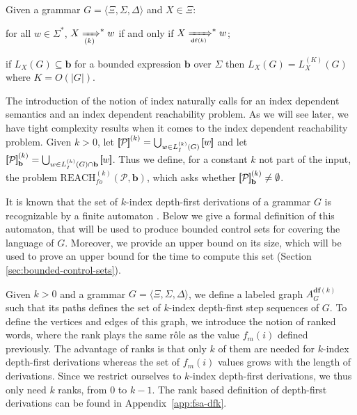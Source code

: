 \documentclass[final]{llncs}
\newcommand{\rbr}{{\bf ]\!\!]}}
\newcommand{\lbr}{{\bf [\!\![}}
\newcommand{\sem}[1]{\lbr #1 \rbr}
\def\tuple#1{{\langle #1 \rangle}}
\def\len#1{{\vert{#1}\vert}}
\def\prod{\Delta}
\def\pat{{\mathbf{b}}}
\def\df#1{\scriptscriptstyle\mathbf{df}(#1)}
\def\Vars{\ensuremath{\Xi}}
\def\foreach{\mathrm{REACH}_{\mathit{fo}}}
\begin{document}
\begin{theorem}\label{thm:luker}
Given a grammar \(G = \tuple{\Vars, \Sigma, \prod} \) and \(X\in\Vars\):
\begin{compactitem}
\item for all \(w\in\Sigma^*\),  \(X \xRightarrow[(k)]{}^* w \) if and only if
	\(X \xRightarrow[\df{k}]{}^* w\);
\item if \(L_X(G) \subseteq \pat\) for a bounded expression \(\pat\) over \(\Sigma\) then
	\(L_X(G) = L_X^{(K)}(G) \) where \(K = O(\len{G}) \).
\end{compactitem}
\end{theorem}

The introduction of the notion of index naturally calls for an index
dependent semantics and an index dependent reachability problem. As we
will see later, we have tight complexity results when it comes to the
index dependent reachability problem. Given \(k>0\),
let \(\sem{\mathcal{P}}^{(k)} = \bigcup_{w \in L_I^{(k)}(G)} \sem{w}\)
and let \(\sem{\mathcal{P}}^{(k)}_{\pat} = \bigcup_{w \in
L_I^{(k)}(G)\cap\pat} \sem{w}\). Thus we define, for a constant \(k\)
not part of the input, the
problem \(\foreach^{(k)}(\mathcal{P},\pat)\), which asks
whether \(\sem{\mathcal{P}}^{(k)}_\pat \neq \emptyset\).


It is known that the set of \(k\)-index depth-first derivations of a
grammar \(G\) is recognizable by a finite
automaton \cite[Lemma~5]{Luker80}. Below we give a formal definition of this
automaton, that will be used to produce bounded control sets for
covering the language of \(G\). Moreover, we provide an upper bound on
its size, which will be used to prove an upper bound for the time
to compute this set (Section \ref{sec:bounded-control-sets}).

Given \(k>0\) and a grammar \(G=\tuple{\Vars, \Sigma, \prod}\), we define a
labeled graph \(A^{\df{k}}_G\) such that its paths defines the set of
\(k\)-index depth-first step sequences of \(G\).  To define the vertices and
edges of this graph, we introduce the notion of ranked words, where the rank
plays the same r\^ole as the value \(f_m(i)\) defined previously. The advantage
of ranks is that only \(k\) of them are needed for \(k\)-index depth-first
derivations whereas the set of \(f_m(i)\) values grows with the length of
derivations. Since we restrict ourselves to \(k\)-index
depth-first derivations, we thus only need \(k\) ranks, from \(0\) to \(k-1\).  
The rank based definition of depth-first derivations can be found in
Appendix~\ref{app:fsa-dfk}.
\end{document}
